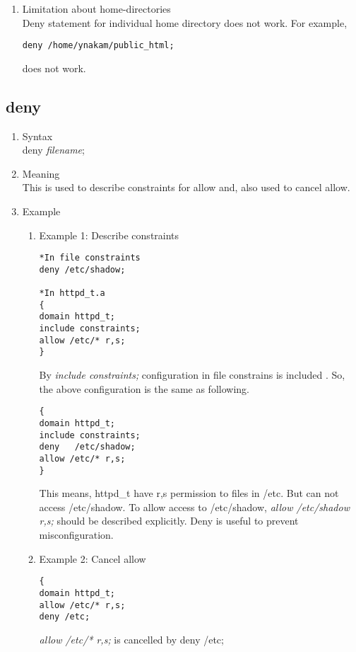 \documentclass{article}
\begin{document}
\begin{enumerate}
	\begin{verbatim}
Example:
        {
          program /usr/sbin/httpd;
          allow /var/www/cgi-bin/test.cgi r,s,dx;
        }
        {
          program /var/www/cgi-bin/test.cgi;
          allow ............
        }
	\end{verbatim}
	In this case, /usr/sbin/httpd have dx permission to
	test.cgi. Domain is defined below. So, test.cgi runs as
	different domain.           
  \item Limitation about home-directories\\
	Deny statement for individual home directory does not work.
	For example,
	\begin{verbatim}
deny /home/ynakam/public_html;
	\end{verbatim}
does not work.

 \end{enumerate}

\subsection{deny}
\begin{enumerate}
 \item Syntax\\
 deny {\it filename};
 \item Meaning\\
This is used to describe constraints for allow and, also used to cancel allow.
 \item Example
\begin{enumerate}
 \item Example 1: Describe constraints\\
   \begin{verbatim}
*In file constraints
deny /etc/shadow;

*In httpd_t.a
{
domain httpd_t;
include constraints;
allow /etc/* r,s; 
}
   \end{verbatim}
By {\it include constraints;} configuration in file constrains is
       included .
So, the above configuration is the same as following.
       \begin{verbatim}
{
domain httpd_t;
include constraints;
deny   /etc/shadow;
allow /etc/* r,s;
}
       \end{verbatim}
This means, httpd\_t have r,s permission to files in /etc. But can not
       access /etc/shadow.
To allow access to /etc/shadow, 
{\it allow /etc/shadow r,s;} should be described explicitly.
Deny is useful to prevent misconfiguration.

 \item Example 2: Cancel allow\\
\begin{verbatim}
{
domain httpd_t;
allow /etc/* r,s;
deny /etc;
\end{verbatim}
{\it allow /etc/* r,s;} is cancelled by deny /etc;

\end{enumerate}
\end{enumerate}
\end{document}
